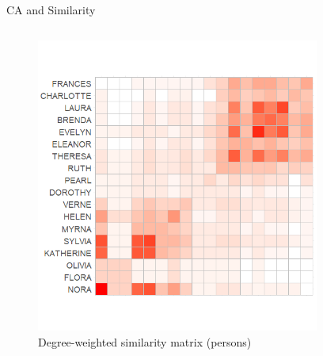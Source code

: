\documentclass[
  ignorenonframetext,
]{beamer}
\begin{document}
\begin{frame}{CA and Similarity}
\protect\hypertarget{ca-and-similarity-2}{}
\begin{columns}[T]
\begin{column}{0.5\textwidth}
\begin{figure}

{\centering \includegraphics{Plots/ca-sim-p.png}

}

\caption{Degree-weighted similarity matrix (persons)}

\end{figure}
\end{column}

\begin{column}{0.5\textwidth}
\begin{figure}


\end{figure}
\end{column}
\end{columns}
\end{frame}
\end{document}
